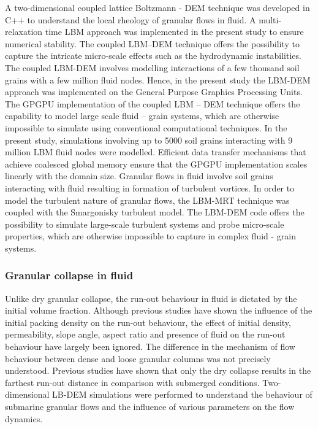 A two-dimensional coupled lattice Boltzmann - DEM technique was developed in 
C++ to understand the local rheology of granular flows in fluid. A 
multi-relaxation time LBM approach was implemented in the present study to 
ensure numerical stability. The coupled LBM--DEM technique offers the 
possibility to capture the intricate micro-scale effects such as the 
hydrodynamic instabilities. The coupled LBM-DEM involves modelling interactions 
of a few thousand soil grains with a few million fluid nodes. Hence, in the 
present study the LBM-DEM approach was implemented on the General Purpose 
Graphics Processing Units. The GPGPU implementation of the coupled LBM -- DEM 
technique offers the capability to model large scale fluid -- grain systems, 
which are otherwise impossible to simulate using conventional computational 
techniques. In the present study, simulations involving up to 5000 soil grains 
interacting with 9 million LBM fluid nodes were modelled. Efficient data 
transfer mechanisms that achieve coalesced global memory ensure that the GPGPU 
implementation scales linearly with the domain size. Granular flows in fluid 
involve soil grains interacting with fluid resulting in formation of turbulent 
vortices. In order to model the turbulent nature of granular flows, the LBM-MRT 
technique was coupled with the Smargonisky turbulent model. The LBM-DEM code 
offers the possibility to simulate large-scale turbulent systems and probe 
micro-scale properties, which are otherwise impossible to capture in complex 
fluid - grain systems.

\subsubsection*{Granular collapse in fluid}

Unlike dry granular collapse, the run-out 
behaviour in fluid is dictated by the initial volume fraction. Although 
previous studies have shown the influence of the initial packing density on the 
run-out behaviour, the effect of initial density, permeability, slope angle, 
aspect ratio and presence of fluid on the run-out behaviour have largely been 
ignored. The difference in the mechanism of flow behaviour between 
dense and loose granular columns was not precisely understood. Previous studies 
have shown that only the dry collapse results in the farthest run-out distance 
in comparison with submerged conditions. Two-dimensional LB-DEM simulations 
were performed to understand the behaviour of submarine granular flows and the 
influence of various parameters on the flow dynamics.

